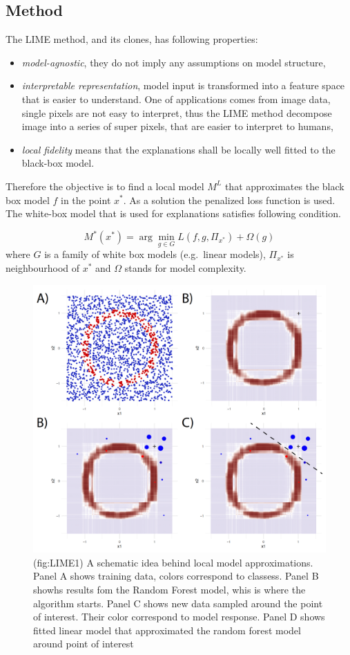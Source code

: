 \documentclass[12pt,]{krantz}
\providecommand{\tightlist}{%
  \setlength{\itemsep}{0pt}\setlength{\parskip}{0pt}}
\theoremstyle{definition}
\theoremstyle{definition}
\theoremstyle{definition}
\theoremstyle{remark}
\begin{document}
\hypertarget{method-8}{%
\subsection{Method}\label{method-8}}

The LIME method, and its clones, has following properties:

\begin{itemize}
\tightlist
\item
  \emph{model-agnostic}, they do not imply any assumptions on model
  structure,
\item
  \emph{interpretable representation}, model input is transformed into a
  feature space that is easier to understand. One of applications comes
  from image data, single pixels are not easy to interpret, thus the
  LIME method decompose image into a series of super pixels, that are
  easier to interpret to humans,
\item
  \emph{local fidelity} means that the explanations shall be locally
  well fitted to the black-box model.
\end{itemize}

Therefore the objective is to find a local model \(M^L\) that
approximates the black box model \(f\) in the point \(x^*\). As a
solution the penalized loss function is used. The white-box model that
is used for explanations satisfies following condition.

\[
M^*(x^*) = \arg \min_{g \in G} L(f, g, \Pi_{x^*}) + \Omega (g) 
\] where \(G\) is a family of white box models (e.g.~linear models),
\(\Pi_{x^*}\) is neighbourhood of \(x^*\) and \(\Omega\) stands for
model complexity.

\begin{figure}

{\centering \includegraphics[width=0.7\linewidth]{figure/circle_4panels} 

}

\caption{(fig:LIME1) A schematic idea behind local model approximations. Panel A shows training data, colors correspond to classess. Panel B showhs results fom the Random Forest model, whis is where the algorithm starts. Panel C shows new data sampled around the point of interest. Their color correspond to model response. Panel D shows fitted linear model that approximated the random forest model around point of interest}\label{fig:LIME1}
\end{figure}
\end{document}
